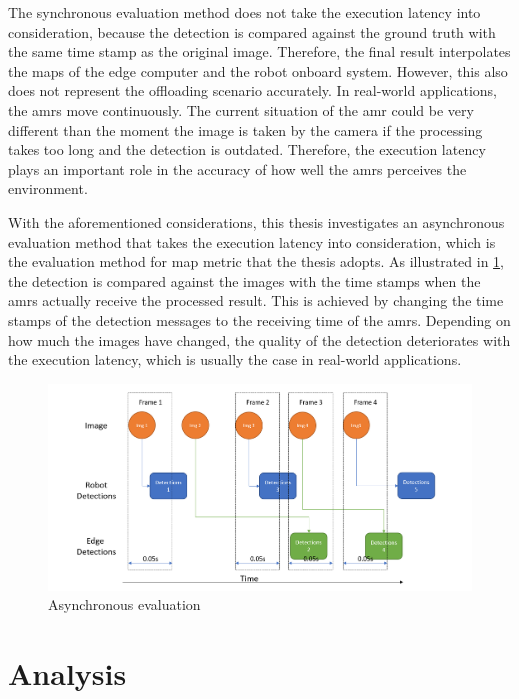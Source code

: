 The synchronous evaluation method does not take the execution latency into consideration, because the detection is compared against the ground truth with the same time stamp as the original image. Therefore, the final result interpolates the \glspl{map} of the edge computer and the robot onboard system. However, this also does not represent the offloading scenario accurately. In real-world applications, the \glspl{amr} move continuously. The current situation of the \gls{amr} could be very different than the moment the image is taken by the camera if the processing takes too long and the detection is outdated. Therefore, the execution latency plays an important role in the accuracy of how well the \glspl{amr} perceives the environment. 

With the aforementioned considerations, this thesis investigates an asynchronous evaluation method that takes the execution latency into consideration, which is the evaluation method for \gls{map} metric that the thesis adopts. As illustrated in \cref{fig:async_eval}, the detection is compared against the images with the time stamps when the \glspl{amr} actually receive the processed result. This is achieved by changing the time stamps of the detection messages to the receiving time of the \glspl{amr}. Depending on how much the images have changed, the quality of the detection deteriorates with the execution latency, which is usually the case in real-world applications.

\begin{figure}[htp]
    \centering
    \includegraphics[width=\linewidth]{figures/setup/async_eval.png}
    \caption{Asynchronous evaluation}
    \label{fig:async_eval}
\end{figure}

\section{Analysis}\label{sec:experiment:analysis}

